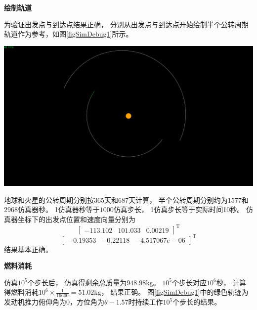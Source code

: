 \noindent\textbf{绘制轨道}\par
为验证出发点与到达点结果正确，
分别从出发点与到达点开始绘制半个公转周期轨道作为参考，如图\ref{figSimDebug1}所示。
\begin{center}
	\includegraphics[scale=0.2]{simdebug1.png}  \\
	\label{figSimDebug1}
\end{center}
地球和火星的公转周期分别按365天和687天计算，
半个公转周期分别约为$1577$和$2968$仿真器秒。
1仿真器秒等于$1000$仿真步长，
1仿真步长等于实际时间10秒。
仿真器坐标下的出发点位置和速度向量分别为
\[[\begin{matrix}
    -113.102 & 101.033 & 0.00219
\end{matrix}]^\text{T}\]
\[[\begin{matrix}
    -0.19353 & -0.22118 & -4.517067e-06
\end{matrix}]^\text{T}\]
结果基本正确。

\noindent\textbf{燃料消耗}\par
仿真$10^5$个步长后，
仿真得剩余总质量为$948.98$kg。
$10^5$个步长对应$10^6$秒，
计算得燃料消耗$10^6\times\frac{1}{19600}=51.02$kg，
结果正确。
图\ref{figSimDebug1}中的绿色轨迹为
发动机推力俯仰角为0，方位角为$\theta-1.57$时持续工作$10^5$个步长的结果。

